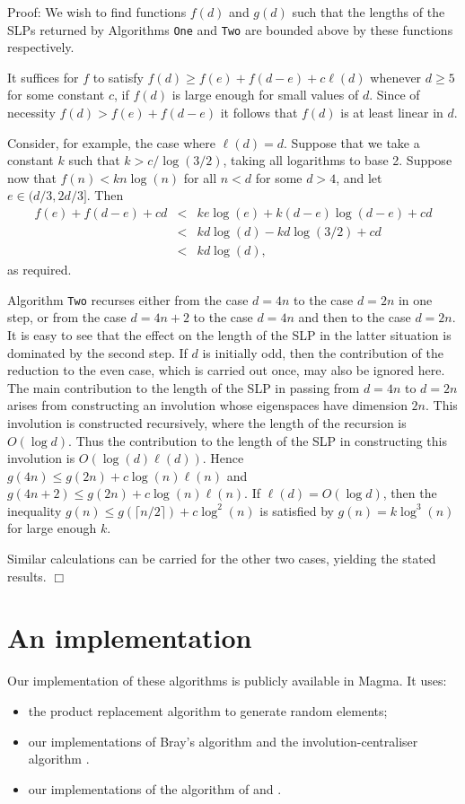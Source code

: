 \documentclass[12pt]{article}
\newenvironment{proof}{\normalsize {\sc Proof}:}{{\hfill $\Box$ \\}}
\begin{document}
\begin{proof}
We wish to find functions $f(d)$ and $g(d)$ such that the lengths of
the SLPs returned by Algorithms {\tt One} and {\tt Two} are bounded
above by these functions respectively.

It suffices for $f$ to satisfy
$f(d)\ge f(e)+f(d-e) + c\ell(d)$ whenever $d\ge5$ for some constant
$c$, if $f(d)$ is large enough for small values of $d$. Since of
necessity $f(d)>f(e)+f(d-e)$ it follows that $f(d)$ is at least linear in $d$.

Consider, for example, the case where $\ell(d)=d$.
Suppose that we take a constant $k$ such that
$k>c/\log(3/2)$, taking all logarithms to base 2. Suppose now that
$f(n) < kn\log(n)$ for  all $n<d$ for some $d>4$, and let
$e\in(d/3,2d/3]$. Then 
\begin{eqnarray*}
f(e)+f(d-e) +cd & < & ke\log(e) + k(d-e)\log(d-e) + cd  \\
                 & < & kd\log(d) -kd\log(3/2)+cd \\
                 & < & kd\log(d),
\end{eqnarray*}
as required. 

Algorithm {\tt Two} recurses either from the case $d=4n$ to the case
$d=2n$ in one step, or from the case $d=4n+2$ to the case $d=4n$ and
then to the case $d=2n$. It is easy to see that the effect on the
length of the SLP in the latter situation is dominated by the second
step. If $d$ is initially odd, then the contribution of the reduction to
the even case, which is carried out once, may also be ignored here.
The main contribution to the length of the SLP in passing from $d=4n$
to $d=2n$ arises from constructing an involution whose eigenspaces
have dimension $2n$. This involution is constructed recursively,
where the length of the recursion is $O(\log d)$. Thus the
contribution to the length of the SLP in constructing this involution
is $O(\log(d)\ell(d))$. 
Hence $g(4n)\le g(2n)+c\log(n)\ell(n)$ and $g(4n+2)\le g(2n)+c\log(n)\ell(n)$.
If $\ell(d)=O(\log d)$, then   the inequality 
$g(n)\le g(\lceil n/2\rceil)+c\log^2(n)$
is satisfied by $g(n)=k\log^3(n)$ for large enough $k$. 

Similar calculations can be carried for the other two cases,
yielding the stated results. 
\end{proof}

\section{An implementation}
Our implementation of these algorithms is publicly available in {\sc Magma}.
It uses:
\begin{itemize}
\item 
the product replacement algorithm \cite{Celleretal95}
to generate random elements; 
\item our implementations of Bray's algorithm \cite{Bray}
and the involution-centraliser algorithm \cite{Ryba-paper}.
\item our implementations of the algorithm of \cite{Conderetal05}
and \cite{sl3q}.
\end{itemize}
\end{document}
